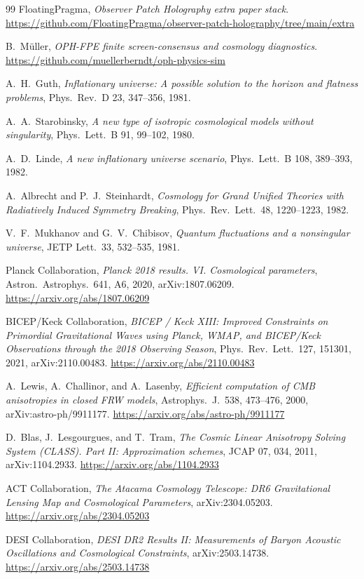 \documentclass[11pt]{article}
\begin{document}
\begin{thebibliography}{99}
FloatingPragma,
\emph{Observer Patch Holography extra paper stack}.
\url{https://github.com/FloatingPragma/observer-patch-holography/tree/main/extra}

B.~M\"uller,
\emph{OPH-FPE finite screen-consensus and cosmology diagnostics}.
\url{https://github.com/muellerberndt/oph-physics-sim}

A.~H.~Guth,
\emph{Inflationary universe: A possible solution to the horizon and flatness problems},
Phys.\ Rev.\ D 23, 347--356, 1981.

A.~A.~Starobinsky,
\emph{A new type of isotropic cosmological models without singularity},
Phys.\ Lett.\ B 91, 99--102, 1980.

A.~D.~Linde,
\emph{A new inflationary universe scenario},
Phys.\ Lett.\ B 108, 389--393, 1982.

A.~Albrecht and P.~J.~Steinhardt,
\emph{Cosmology for Grand Unified Theories with Radiatively Induced Symmetry Breaking},
Phys.\ Rev.\ Lett.\ 48, 1220--1223, 1982.

V.~F.~Mukhanov and G.~V.~Chibisov,
\emph{Quantum fluctuations and a nonsingular universe},
JETP Lett.\ 33, 532--535, 1981.

Planck Collaboration,
\emph{Planck 2018 results. VI. Cosmological parameters},
Astron.\ Astrophys.\ 641, A6, 2020, arXiv:1807.06209.
\url{https://arxiv.org/abs/1807.06209}

BICEP/Keck Collaboration,
\emph{BICEP / Keck XIII: Improved Constraints on Primordial Gravitational Waves using Planck, WMAP, and BICEP/Keck Observations through the 2018 Observing Season},
Phys.\ Rev.\ Lett.\ 127, 151301, 2021, arXiv:2110.00483.
\url{https://arxiv.org/abs/2110.00483}

A.~Lewis, A.~Challinor, and A.~Lasenby,
\emph{Efficient computation of CMB anisotropies in closed FRW models},
Astrophys.\ J.\ 538, 473--476, 2000, arXiv:astro-ph/9911177.
\url{https://arxiv.org/abs/astro-ph/9911177}

D.~Blas, J.~Lesgourgues, and T.~Tram,
\emph{The Cosmic Linear Anisotropy Solving System (CLASS). Part II: Approximation schemes},
JCAP 07, 034, 2011, arXiv:1104.2933.
\url{https://arxiv.org/abs/1104.2933}

ACT Collaboration,
\emph{The Atacama Cosmology Telescope: DR6 Gravitational Lensing Map and Cosmological Parameters},
arXiv:2304.05203.
\url{https://arxiv.org/abs/2304.05203}

DESI Collaboration,
\emph{DESI DR2 Results II: Measurements of Baryon Acoustic Oscillations and Cosmological Constraints},
arXiv:2503.14738.
\url{https://arxiv.org/abs/2503.14738}

\end{thebibliography}
\end{document}
